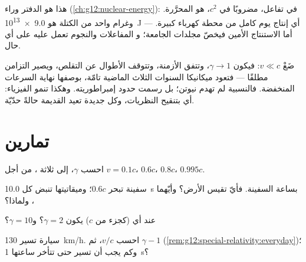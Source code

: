\begin{remark}\label{rem:g12:special-relativity:emc2seen}
هذا هو الدفتر وراء  (\cref{ch:g12:nuclear-energy}):
 في تفاعل، مضروبًا في $c^2$، هو  المحرَّرة. وغرام
واحد من الكتلة هو \qty{9.0e13}{J} --- أي إنتاج يوم كامل من محطة كهرباء
كبيرة. أما الاستنتاج الأمين فيخصّ مجلدات الجامعة؛ و
المفاعلات والنجوم تعمل عليه على أي حال.
\end{remark}

\begin{remark}\label{rem:g12:special-relativity:newton}
ضَعْ $v \ll c$: فيكون $\gamma \to 1$، وتتفق الأزمنة، وتتوقف الأطوال عن التقلص،
ويصير التزامن مطلقًا --- فتعود ميكانيكا السنوات الثلاث الماضية
تامّة، بوصفها نهاية السرعات المنخفضة. فالنسبية لم تهدم
نيوتن؛ بل رسمت حدود إمبراطوريته. وهكذا تنمو الفيزياء: أي
بتنقيح النظريات، وكل جديدة تعيد القديمة حالةً حدّيّة.
\end{remark}

\section{تمارين}

\begin{exercise}[$\star$]\label{exo:g12:special-relativity:1}
احسب $\gamma$، إلى ثلاثة ، من أجل $v = 0.1c$، $0.6c$، $0.8c$، $0.995c$.
\end{exercise}

\begin{exercise}[$\star$]\label{exo:g12:special-relativity:2}
سفينة تبحر  $0.6c$؛ وميقاتيتها تنبض كل \qty{10.0}{s} بساعة
السفينة. فأيّ  تقيس الأرض؟ وأيّهما ، ولماذا؟
\end{exercise}

\begin{exercise}[$\star$]\label{exo:g12:special-relativity:3}
عند أي  (كجزء من $c$) يكون $\gamma = 2$؟ و$\gamma = 10$؟
\end{exercise}

\begin{exercise}[$\star$]\label{exo:g12:special-relativity:4}
سيارة تسير  \qty{130}{km/h}. احسب $v/c$، ثم $\gamma - 1$
(\cref{rem:g12:special-relativity:everyday})؛ وكم يجب أن تسير حتى تتأخر
ساعتها \qty{1}{s}؟
\end{exercise}

